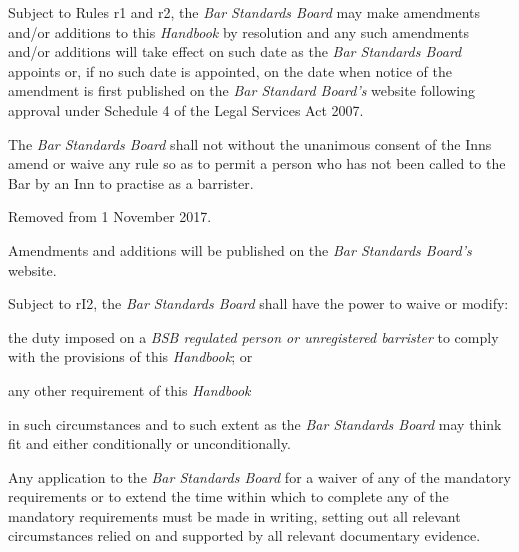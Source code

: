 
Subject to Rules r1 and r2, the \emph{Bar Standards Board} may make
amendments and/or additions to this \emph{Handbook} by resolution and
any such amendments and/or additions will take effect on such date as
the \emph{Bar Standards Board} appoints or, if no such date is
appointed, on the date when notice of the amendment is first published
on the \emph{Bar Standard Board's} website following approval under
Schedule 4 of the Legal Services Act 2007.


The \emph{Bar Standards Board} shall not without the unanimous consent
of the Inns amend or waive any rule so as to permit a person who has not
been called to the Bar by an Inn to practise as a barrister.


Removed from 1 November 2017.


Amendments and additions will be published on the \emph{Bar Standards
Board's} website.




Subject to rI2, the \emph{Bar Standards Board} shall have the power to
waive or modify:
\begin{numlist}
\item the duty imposed on a \emph{BSB regulated person or unregistered
barrister} to comply with the provisions of this \emph{Handbook}; or
\item any other requirement of this \emph{Handbook}
\item in such circumstances and to such extent as the \emph{Bar Standards
Board} may think fit and either conditionally or unconditionally.
\end{numlist}

Any application to the \emph{Bar Standards Board} for a waiver of any of
the mandatory requirements or to extend the time within which to
complete any of the mandatory requirements must be made in writing,
setting out all relevant circumstances relied on and supported by all
relevant documentary evidence.




